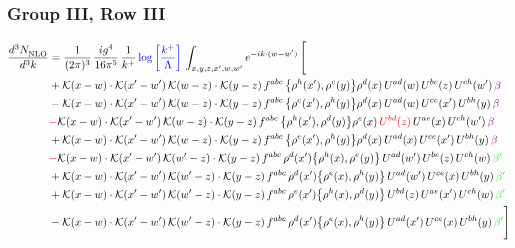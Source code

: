 \documentclass[9pt]{article}
\numberwithin{equation}{section}
\begin{document}
\subsubsection{Group III, Row III} 
\begin{align}
     \frac{d^{3}N_{\rm NLO}^{\rm}}{d^{3}k}  & = \frac{1}{(2\pi)^{3}}\, \frac{ig^{4}}{16\pi^{5}}\, \frac{1}{k^{+}}\, {\color{blue}\log{\left[\frac{k^{+}}{\Lambda}\right]}}\, \int_{x,y,z,x^{\prime},w,w^{\prime}}e^{-ik\cdot (w-w')}\, \Bigg[\notag \\ & +\mathcal{K}(x-w)\cdot\mathcal{K}(x'-w')\,\mathcal{K}(w-z)\cdot\mathcal{K}(y-z)\, f^{abc}\,\big\{\rho^{h}(x'),\rho^{e}(y)\big\}\rho^{d}(x)\,U^{ad}(w)\,U^{be}(z)\,U^{ch}(w')\,{\color{violet}\beta}\notag\\
&-\mathcal{K}(x-w)\cdot\mathcal{K}(x'-w')\,\mathcal{K}(w-z)\cdot\mathcal{K}(y-z)\, f^{abc}\,\big\{\rho^{e}(x'),\rho^{h}(y)\big\}\rho^{d}(x)\,U^{ad}(w)\,U^{ce}(x')\,U^{bh}(y)\,{\color{violet}\beta}\notag\\ &{\color{red}-}\mathcal{K}(x-w)\cdot\mathcal{K}(x'-w')\,\mathcal{K}(w-z)\cdot\mathcal{K}(y-z)\, f^{abc}\,\big\{\rho^{h}(x'),\rho^{d}(y)\big\}\rho^{e}(x)\,{\color{red}U^{bd}(z)}\,U^{ae}(x)\,U^{ch}(w')\,{\color{violet}\beta}\notag\\ & +\mathcal{K}(x-w)\cdot\mathcal{K}(x'-w')\,\mathcal{K}(w-z)\cdot\mathcal{K}(y-z)\, f^{abc}\,\big\{\rho^{e}(x'),\rho^{h}(y)\big\}\rho^{d}(x)\,U^{ad}(x)\,U^{ce}(x')\,U^{bh}(y)\,{\color{violet}\beta}\notag\\ &{\color{red}-}\mathcal{K}(x-w)\cdot\mathcal{K}(x'-w')\,\mathcal{K}(w'-z)\cdot\mathcal{K}(y-z)\, f^{abc}\,\rho^{d}(x')\big\{\rho^{h}(x),\rho^{e}(y)\big\}\,U^{ad}(w')\,U^{be}(z)\,U^{ch}(w)\,{\color{green}\beta'}\notag\\ &+\mathcal{K}(x-w)\cdot\mathcal{K}(x'-w')\,\mathcal{K}(w'-z)\cdot\mathcal{K}(y-z)\, f^{abc}\,\rho^{d}(x')\big\{\rho^{e}(x),\rho^{h}(y)\big\}\,U^{ad}(w')\,U^{ce}(x)\,U^{bh}(y)\,{\color{green}\beta'} \notag\\ & +\mathcal{K}(x-w)\cdot\mathcal{K}(x'-w')\,\mathcal{K}(w'-z)\cdot\mathcal{K}(y-z)\, f^{abc}\,\rho^{e}(x')\big\{\rho^{h}(x),\rho^{d}(y)\big\}\,U^{bd}(z)\,U^{ae}(x')\,U^{ch}(w)\,{\color{green}\beta'} \notag\\ & -\mathcal{K}(x-w)\cdot\mathcal{K}(x'-w')\,\mathcal{K}(w'-z)\cdot\mathcal{K}(y-z)\, f^{abc}\,\rho^{d}(x')\big\{\rho^{e}(x),\rho^{h}(y)\big\}\,U^{ad}(x')\,U^{ce}(x)\,U^{bh}(y)\,{\color{green}\beta'}\Bigg]\end{align}     
\end{document}
